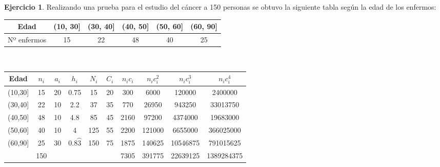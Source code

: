 \documentclass[a4paper, 12pt]{article}
\theoremstyle{definition}
\newtheorem{ej}{Ejercicio}
\begin{document}
\begin{ej}
Realizando una prueba para el estudio del cáncer a 150 personas se obtuvo la siguiente tabla según la edad de los enfermos:

\begin{center}
    \begin{tabular}{|c|c|c|c|c|c|}
    \hline
         Edad & (10, 30] & (30, 40] & (40, 50] & (50, 60] & (60, 90]  \\
         \hline
         Nº enfermos & 15 & 22 & 48 & 40 & 25 \\ 
         \hline
    \end{tabular} \\ 
    \vspace{0.5cm}
    \begin{tabular}{|c|c|c|c|c|c|c|c|c|c|} 
    \hline
         Edad & $n_{i}$ & $a_{i}$ & $h_{i}$ & $N_{i}$ & $C_{i}$ & $n_{i}c_{i}$ & $n_{i}c_{i}^2$ & $n_{i}c_{i}^3$ & $n_{i}c_{i}^4$ \\
         \hline
         (10,30] & 15 & 20 & 0.75 & 15 & 20 & 300 & 6000 & 120000 & 2400000\\ 
         \hline
         (30,40] & 22 & 10 & 2.2 & 37 & 35 & 770 & 26950 & 943250 & 33013750\\ 
         \hline
         (40,50] & 48 & 10 & 4.8 & 85 & 45 & 2160 & 97200 & 4374000 & 19683000\\ 
         \hline
         (50,60] & 40 & 10 & 4 & 125 & 55 & 2200 & 121000 & 6655000 & 366025000\\ 
         \hline
         (60,90] & 25 & 30 & $0.8\wideparen{3}$ & 150 & 75 & 1875 & 140625 & 10546875 & 791015625\\ 
         \hline
         & 150 & & & & & 7305 & 391775 & 22639125 & 1389284375 \\ 
    \end{tabular}
\end{center}


\end{ej}
\end{document}
